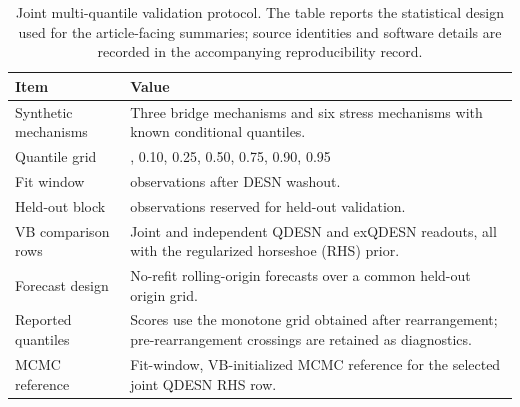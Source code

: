 \begin{table}[!htbp]
\centering
\small
\begin{tabular}{@{}>{\raggedright\arraybackslash}p{}>{\raggedright\arraybackslash}p{}@{}}
\toprule
Item & Value
\\
\midrule
Synthetic mechanisms & Three bridge mechanisms and six stress mechanisms with known conditional quantiles. \\
Quantile grid & 0.05, 0.10, 0.25, 0.50, 0.75, 0.90, 0.95 \\
Fit window & 500 observations after DESN washout. \\
Held-out block & 1000 observations reserved for held-out validation. \\
VB comparison rows & Joint and independent QDESN and exQDESN readouts, all with the regularized horseshoe (RHS) prior. \\
Forecast design & No-refit rolling-origin forecasts over a common held-out origin grid. \\
Reported quantiles & Scores use the monotone grid obtained after rearrangement; pre-rearrangement crossings are retained as diagnostics. \\
MCMC reference & Fit-window, VB-initialized MCMC reference for the selected joint QDESN RHS row. \\
\bottomrule
\end{tabular}
\caption{Joint multi-quantile validation protocol. The table reports the statistical design used for the article-facing summaries; source identities and software details are recorded in the accompanying reproducibility record.}
\label{tab:joint-qdesn-article-validation-protocol}
\end{table}
